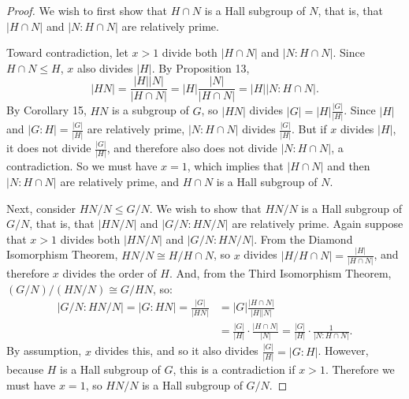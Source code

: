 \documentclass{article}
\begin{document}
\begin{proof}
    We wish to first show that $H \cap N$ is a Hall subgroup of $N$, that is, that $|H \cap N|$ and $|N : H \cap N|$ are relatively prime.
    
    Toward contradiction, let $x > 1$ divide both $|H \cap N|$ and $|N : H \cap N|$. Since $H \cap N \leq H$, $x$ also divides $|H|$. By Proposition 13,
    \begin{equation*}
        |HN| = \frac{|H||N|}{|H \cap N|} = |H| \frac{|N|}{|H \cap N|} = |H||N : H \cap N|.
    \end{equation*}
    By Corollary 15, $HN$ is a subgroup of $G$, so $|HN|$ divides $|G| = |H|\frac{|G|}{|H|}$. Since $|H|$ and $|G : H| = \frac{|G|}{|H|}$ are relatively prime, $|N : H \cap N|$ divides $\frac{|G|}{|H|}$. But if $x$ divides $|H|$, it does not divide $\frac{|G|}{|H|}$, and therefore also does not divide $|N : H \cap N|$, a contradiction. So we must have $x = 1$, which implies that $|H \cap N|$ and then $|N : H \cap N|$ are relatively prime, and $H \cap N$ is a Hall subgroup of $N$.

    Next, consider $HN/N \leq G/N$. We wish to show that $HN/N$ is a Hall subgroup of $G/N$, that is, that $|HN/N|$ and $|G/N : HN / N|$ are relatively prime. Again suppose that $x > 1$ divides both $|HN/N|$ and $|G/N : HN / N|$. From the Diamond Isomorphism Theorem, $HN/N \cong H/H \cap N$, so $x$ divides $|H/H \cap N| = \frac{|H|}{|H \cap N|}$, and therefore $x$ divides the order of $H$. And, from the Third Isomorphism Theorem, $(G/N)/(HN/N) \cong G/HN$, so:
    \begin{align*}
        |G/N : HN / N| = |G:HN| = \frac{|G|}{|HN|} &= |G|\frac{|H \cap N|}{|H||N|} \\ &= \frac{|G|}{|H|} \cdot \frac{|H \cap N|}{|N|} = \frac{|G|}{|H|} \cdot \frac{1}{|N:H \cap N|}.
    \end{align*}
    By assumption, $x$ divides this, and so it also divides $\frac{|G|}{|H|} = |G:H|$. However, because $H$ is a Hall subgroup of $G$, this is a contradiction if $x > 1$. Therefore we must have $x = 1$, so $HN/N$ is a Hall subgroup of $G/N$.
\end{proof}
\end{document}

